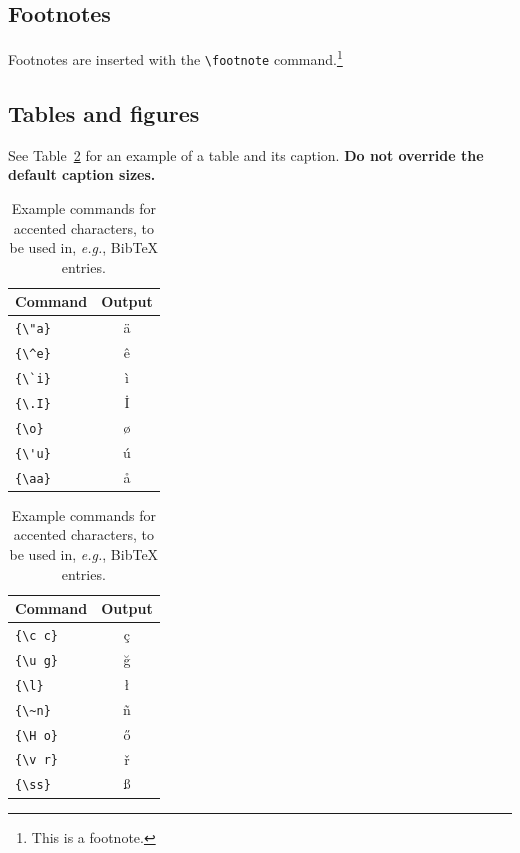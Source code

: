 \documentclass[11pt]{article}
\begin{document}
\subsection{Footnotes}

Footnotes are inserted with the \verb|\footnote| command.\footnote{This is a footnote.}

\subsection{Tables and figures}

See Table~\ref{tab:accents} for an example of a table and its caption.
\textbf{Do not override the default caption sizes.}

\begin{table}
  \centering
  \begin{tabular}{lc}
    \hline
    \textbf{Command} & \textbf{Output} \\
    \hline
    \verb|{\"a}|     & {\"a}           \\
    \verb|{\^e}|     & {\^e}           \\
    \verb|{\`i}|     & {\`i}           \\
    \verb|{\.I}|     & {\.I}           \\
    \verb|{\o}|      & {\o}            \\
    \verb|{\'u}|     & {\'u}           \\
    \verb|{\aa}|     & {\aa}           \\\hline
  \end{tabular}
  \begin{tabular}{lc}
    \hline
    \textbf{Command} & \textbf{Output} \\
    \hline
    \verb|{\c c}|    & {\c c}          \\
    \verb|{\u g}|    & {\u g}          \\
    \verb|{\l}|      & {\l}            \\
    \verb|{\~n}|     & {\~n}           \\
    \verb|{\H o}|    & {\H o}          \\
    \verb|{\v r}|    & {\v r}          \\
    \verb|{\ss}|     & {\ss}           \\
    \hline
  \end{tabular}
  \caption{Example commands for accented characters, to be used in, \emph{e.g.}, Bib\TeX{} entries.}
  \label{tab:accents}
\end{table}
\end{document}
